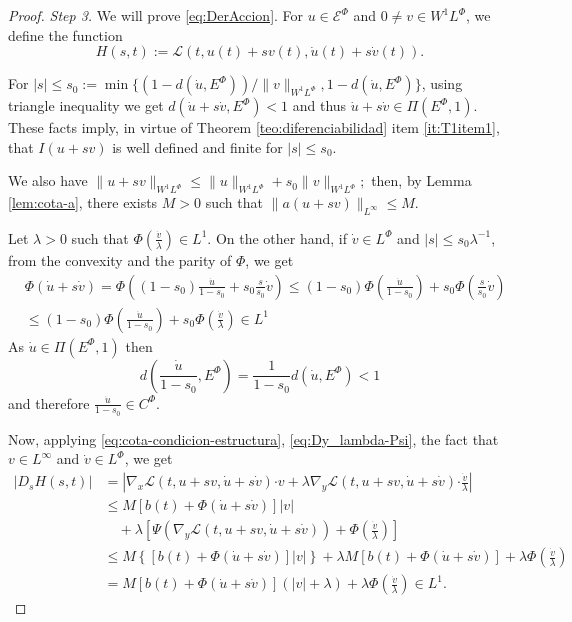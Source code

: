 \documentclass[twoside]{article}
\theoremstyle{remark}
\newcommand{\linf}{\|_{L^{\infty}}}
\newcommand{\lphi}{L^{\Phi}}
\newcommand{\ephi}{E^{\Phi}}
\newcommand{\wphi}{W^{1}\lphi}
\newcommand{\sobnor}{\|_{W^{1}\lphi}}
\newcommand{\domi}{\mathcal{E}^{\Phi}}
\renewcommand{\b}[1]{\boldsymbol{#1}}
\newcommand{\ccdot}{\b{\cdot}}
\renewcommand{\leq}{\leqslant}
\begin{document}
\begin{proof}
\emph{Step 3.} We will prove \eqref{eq:DerAccion}. 
For $u\in \domi$ and $0\neq v\in\wphi$, we define the function
\[H(s,t):=\mathcal{L}(t,u(t)+s v(t),\dot{u}(t)+s\dot{v}(t)).\]


For  $|s|\leq s_0:=\min\{\left(1-d(\dot{u},\ephi)\right)/\|v\sobnor, 1-d(\dot{u},\ephi)\}$, 
using triangle inequality we get 
$
d \left(\dot{u}+s \dot{v}, \ephi \right)<1$ and thus $\dot{u}+s\dot{v} \in \Pi(\ephi,1)$. 
These facts imply, in virtue of Theorem \ref{teo:diferenciabilidad} item \ref{it:T1item1}, 
that $I(u+s v)$ is well defined and finite for $|s|\leq s_0$. 

We also have 
$
\|u+sv\sobnor\leq \|u\sobnor+s_0\|v\sobnor;
$
then, by Lemma \ref{lem:cota-a}, there exists $M>0$ such that 
$\|a(u+sv)\linf\leq M$.

Let $\lambda>0$ such that $\Phi(\frac{\dot{v}}{\lambda})\in L^1$.
On the other hand, if $\dot{v}\in\lphi$ and $|s|\leq s_0 \lambda^{-1}$,
from the convexity and the parity of $\Phi$, we get
\[
\begin{split}
&\Phi(\dot{u}+s\dot{v})=
\Phi\left((1-s_0)\frac{\dot{u}}{1-s_0}+s_0 \frac{s}{s_0}\dot{v}\right)
\leq
(1-s_0)\Phi\left(\frac{\dot{u}}{1-s_0}\right)+s_0 \Phi\left(\frac{s}{s_0}\dot{v}\right)
\\
&\leq
(1-s_0)\Phi\left(\frac{\dot{u}}{1-s_0}\right)+s_0 \Phi\left(\frac{\dot{v}}{\lambda}\right)
\in L^1
\end{split}
\]
As $\dot{u}\in\Pi(\ephi,1)$ then
\[
d\left(\frac{\dot{u}}{1-s_0},E^{\Phi}\right)=\frac{1}{1-s_0}d(\dot{u}, E^{\Phi})<1
\]
and therefore $\frac{\dot{u}}{1-s_0}\in C^\Phi$.

Now, applying \eqref{eq:cota-condicion-estructura}, \eqref{eq:Dy_lambda-Psi},  
the fact that $v \in L^{\infty}$ and $\dot{v}\in\lphi$, 
we get
\begin{equation}\label{ctg}
\begin{split}
|D_s H(s,t)|&=\left| \nabla_x\mathcal{L}(t,u+sv,\dot{u}+s\dot{v})\ccdot v +  
\lambda \nabla_y\mathcal{L}(t, u+s v, \dot{u}+s\dot{v})\ccdot\frac{\dot{v}}{\lambda}\right| \\
  & \leq M \left[ b(t)+ \Phi(\dot{u}+s\dot{v})\right]|v|\\
 &\quad+ \lambda\left[\Psi(\nabla_y\mathcal{L}(t,u+sv,\dot{u}+s\dot{v}))+\Phi\left(\frac{\dot{v}}{\lambda}\right) \right]
\\
 &\leq M \left\{\left[ b(t)+ \Phi(\dot{u}+s\dot{v})\right]|v|\right\}+
 \lambda M[ b(t)+ \Phi(\dot{u}+s\dot{v})]+\lambda \Phi\left(\frac{\dot{v}}{\lambda}\right)
 \\
 &=
 M [ b(t)+ \Phi(\dot{u}+s\dot{v})] (|v|+\lambda) +\lambda \Phi\left(\frac{\dot{v}}{\lambda}\right)
 \in L^1.
\end{split}
\end{equation}


\end{proof}
\end{document}
